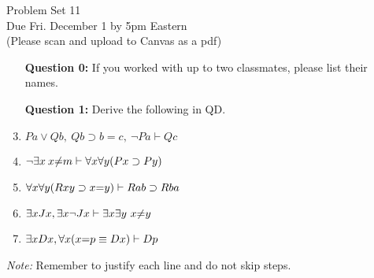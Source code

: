 \documentclass[12pt]{article}
\def\eor{\ensuremath{\vee}}
\def\eand{\ensuremath{\,\&\,}}
\def\eif{\ensuremath{\supset}}
\def\eiff{\ensuremath{\equiv}}
\begin{document}
% 
% 

\thispagestyle{empty}



\begin{center}
\Large Problem Set 11\\[1ex] 
 Due Fri. December 1 by 5pm Eastern\\ 
  \vspace{.1in}
  \normalsize{(Please scan and upload to Canvas as a pdf)} \\[3ex] 
\end{center}


\begin{enumerate}[leftmargin=.75in]
  \item[\bf Question 0:] If you worked with up to two classmates, please list their names.
  \item[\bf Question 1:] Derive the following in QD.
  \item $Pa \vee Qb,\ Qb \supset b = c,\ \neg Pa \vdash Qc$
  \item $\neg \qt{\exists}{x} \: x {\neq} m \vdash \qt{\forall}{x}\qt{\forall}{y} (Px \eif Py)$
  \item $\qt{\forall}{x}\qt{\forall}{y}(Rxy \eif x{=}y)\vdash Rab \eif Rba$
  \item $\exists x Jx, \exists x \neg Jx\vdash \exists x \exists y\ x{\neq} y$
  \item $\qt{\exists}{x} Dx, \qt{\forall}{x}(x{=}p \eiff Dx)\vdash Dp$
\end{enumerate}

\textit{Note:} Remember to justify each line and do not skip steps.
\end{document}
